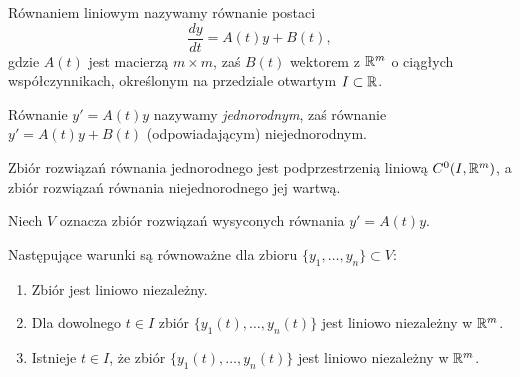 
\begin{definition}
  Równaniem liniowym nazywamy równanie postaci
  \[
    \frac{dy}{dt} = A(t)y + B(t),
  \]
  gdzie $A(t)$ jest macierzą $m \times m$, zaś $B(t)$ wektorem z $\mathbb{R}^m$ o ciągłych współczynnikach,
  określonym na przedziale otwartym $I \subset \mathbb{R}$.
\end{definition}

\begin{definition}
  Równanie $y' = A(t)y$ nazywamy \emph{jednorodnym}, zaś równanie $y' = A(t)y + B(t)$ (odpowiadającym)
  niejednorodnym.
\end{definition}

\begin{theorem}
  Zbiór rozwiązań równania jednorodnego jest podprzestrzenią liniową $C^0(I,\mathbb{R}^m)$, a zbiór rozwiązań
  równania niejednorodnego jej wartwą.
\end{theorem}

\noindent Niech $V$ oznacza zbiór rozwiązań wysyconych równania $y' = A(t)y$.

\begin{statement}
  Następujące warunki są równoważne dla zbioru $\{y_1, \ldots, y_n\} \subset V$:
  \begin{enumerate}
    \item Zbiór jest liniowo niezależny.
    \item Dla dowolnego $t \in I$ zbiór $\big\{y_1(t), \ldots, y_n(t)\big\}$ jest liniowo niezależny w $\mathbb{R}^m$.
    \item Istnieje $t \in I$, że zbiór $\big\{y_1(t), \ldots, y_n(t)\big\}$ jest liniowo niezależny w $\mathbb{R}^m$.
  \end{enumerate}
\end{statement}